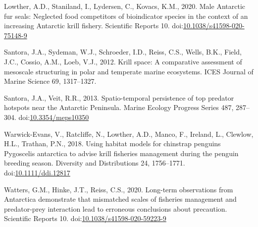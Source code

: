 \documentclass[]{elsarticle} %
\begin{document}
\leavevmode\hypertarget{ref-Lowther2020}{}%
Lowther, A.D., Staniland, I., Lydersen, C., Kovacs, K.M., 2020. Male
Antarctic fur seals: Neglected food competitors of bioindicator species
in the context of an increasing Antarctic krill fishery. Scientific
Reports 10.
doi:\href{https://doi.org/10.1038/s41598-020-75148-9}{10.1038/s41598-020-75148-9}

\leavevmode\hypertarget{ref-santoraKrillSpaceComparative2012}{}%
Santora, J.A., Sydeman, W.J., Schroeder, I.D., Reiss, C.S., Wells, B.K.,
Field, J.C., Cossio, A.M., Loeb, V.J., 2012. Krill space: A comparative
assessment of mesoscale structuring in polar and temperate marine
ecosystems. ICES Journal of Marine Science 69, 1317--1327.

\leavevmode\hypertarget{ref-Santora2013}{}%
Santora, J.A., Veit, R.R., 2013. Spatio-temporal persistence of top
predator hotspots near the Antarctic Peninsula. Marine Ecology Progress
Series 487, 287--304.
doi:\href{https://doi.org/10.3354/meps10350}{10.3354/meps10350}

\leavevmode\hypertarget{ref-Warwick-Evans2018}{}%
Warwick-Evans, V., Ratcliffe, N., Lowther, A.D., Manco, F., Ireland, L.,
Clewlow, H.L., Trathan, P.N., 2018. Using habitat models for chinstrap
penguins Pygoscelis antarctica to advise krill fisheries management
during the penguin breeding season. Diversity and Distributions 24,
1756--1771.
doi:\href{https://doi.org/10.1111/ddi.12817}{10.1111/ddi.12817}

\leavevmode\hypertarget{ref-Watters2020}{}%
Watters, G.M., Hinke, J.T., Reiss, C.S., 2020. Long-term observations
from Antarctica demonstrate that mismatched scales of fisheries
management and predator-prey interaction lead to erroneous conclusions
about precaution. Scientific Reports 10.
doi:\href{https://doi.org/10.1038/s41598-020-59223-9}{10.1038/s41598-020-59223-9}
\end{document}
